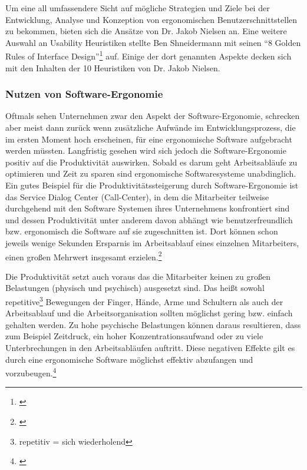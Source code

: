 Um eine all umfassendere Sicht auf mögliche Strategien und Ziele bei der Entwicklung, Analyse und Konzeption von ergonomischen Benutzerschnittstellen zu bekommen, bieten sich die Ansätze von Dr. Jakob Nielsen an. Eine weitere Auswahl an Usability Heuristiken stellte Ben Shneidermann mit seinen \enquote{8 Golden Rules of Interface Design}\footnote{\cite{Wong2018}} auf. Einige der dort genannten Aspekte decken sich mit den Inhalten der 10 Heuristiken von Dr. Jakob Nielsen.


\subsubsection{Nutzen von Software-Ergonomie}
Oftmals sehen Unternehmen zwar den Aspekt der Software-Ergonomie, schrecken aber meist dann zurück wenn zusätzliche Aufwände im Entwicklungsprozess, die im ersten Moment hoch erscheinen, für eine ergonomische Software aufgebracht werden müssten. Langfristig gesehen wird sich jedoch die Software-Ergonomie positiv auf die Produktivität auswirken. Sobald es darum geht Arbeitsabläufe zu optimieren und Zeit zu sparen sind ergonomische Softwaresysteme unabdinglich. Ein gutes Beispiel für die Produktivitätssteigerung durch Software-Ergonomie ist das Service Dialog Center (Call-Center), in dem die Mitarbeiter teilweise durchgehend mit den Software Systemen ihres Unternehmens konfrontiert sind und dessen Produktivität unter anderem davon abhängt wie benutzerfreundlich bzw. ergonomisch die Software auf sie zugeschnitten ist. Dort können schon jeweils wenige Sekunden Ersparnis im Arbeitsablauf eines einzelnen Mitarbeiters, einen großen Mehrwert insgesamt erzielen.\footnote{\cite[vgl.][19]{Pruemper_Harten2007}}

Die Produktivität setzt auch voraus das die Mitarbeiter keinen zu großen Belastungen (physisch und psychisch) ausgesetzt sind. Das heißt sowohl repetitive\footnote{repetitiv = sich wiederholend} Bewegungen der Finger, Hände, Arme und Schultern als auch der Arbeitsablauf und die Arbeitsorganisation sollten möglichst gering bzw. einfach gehalten werden. Zu hohe psychische Belastungen können daraus resultieren, dass zum Beispiel Zeitdruck, ein hoher Konzentrationsaufwand oder zu viele Unterbrechungen in den Arbeitsabläufen auftritt. Diese negativen Effekte gilt es durch eine ergonomische Software möglichst effektiv abzufangen und vorzubeugen.\footnote{\cite[vgl.][19]{Pruemper_Harten2007}}

